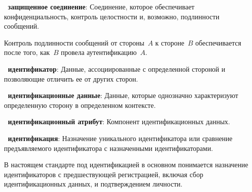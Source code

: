 {\bf \thedefctr~защищенное соединение}: %
Соединение, которое обеспечивает конфиденциальность, контроль целостности и,
возможно, подлинности сообщений.

\begin{note*}
Контроль подлинности сообщений от стороны~$A$ к стороне~$B$ обеспечивается после
того, как~$B$ провела аутентификацию~$A$.
\end{note*}

{\bf \thedefctr~идентификатор}:
Данные, ассоциированные с определенной стороной и позволяющие отличить ее от
других сторон.





{\bf \thedefctr~идентификационные данные}:
Данные, которые однозначно характеризуют определенную сторону в определенном 
контексте.



{\bf \thedefctr~идентификационный атрибут}:
Компонент идентификационных данных.

{\bf \thedefctr~идентификация}: %
Назначение уникального идентификатора или сравнение предъявляемого
идентификатора с назначенными идентификаторами.

\begin{note*}
В настоящем стандарте под идентификацией в основном понимается назначение
идентификаторов с предшествующей регистрацией, включая сбор идентификационных 
данных, и подтверждением личности.
\end{note*}

